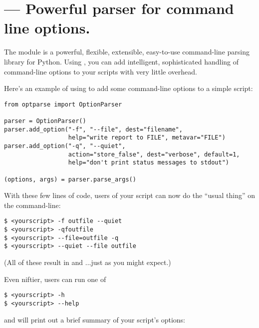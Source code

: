 \section{ ---
        Powerful parser for command line options.}




The  module is a powerful, flexible, extensible,
easy-to-use command-line parsing library for Python.  Using
, you can add intelligent, sophisticated handling of
command-line options to your scripts with very little overhead.

Here's an example of using  to add some command-line
options to a simple script:

\begin{verbatim}
from optparse import OptionParser

parser = OptionParser()
parser.add_option("-f", "--file", dest="filename",
                  help="write report to FILE", metavar="FILE")
parser.add_option("-q", "--quiet",
                  action="store_false", dest="verbose", default=1,
                  help="don't print status messages to stdout")

(options, args) = parser.parse_args()
\end{verbatim}

With these few lines of code, users of your script can now do the
``usual thing'' on the command-line:

\begin{verbatim}
$ <yourscript> -f outfile --quiet
$ <yourscript> -qfoutfile
$ <yourscript> --file=outfile -q
$ <yourscript> --quiet --file outfile
\end{verbatim}

(All of these result in  and
 ...just as you might expect.)

Even niftier, users can run one of
\begin{verbatim}
$ <yourscript> -h
$ <yourscript> --help
\end{verbatim}
and  will print out a brief summary of your script's
options:

